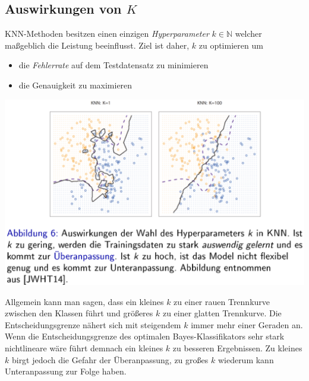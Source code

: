 \documentclass{report}
\begin{document}
  \subsection{Auswirkungen von $K$}	
  KNN-Methoden besitzen einen einzigen \textit{Hyperparameter} $k \in \mathbb{N}$ welcher maßgeblich die Leistung beeinflusst.	
  Ziel ist daher, $k$ zu optimieren um\\	
  \vspace*{-1.5em}	
  \begin{itemize}	
    \item die \textit{Fehlerrate} auf dem Testdatensatz zu minimieren	
    \item die Genauigkeit zu maximieren	
  \end{itemize}	
  
  \begin{center}	
    \includegraphics[scale=.35]{ml05_5}	
  \end{center}	
  
  Allgemein kann man sagen, dass ein kleines $k$ zu einer rauen Trennkurve zwischen den Klassen führt und größeres $k$ zu einer glatten Trennkurve.	
  Die Entscheidungsgrenze nähert sich mit steigendem $k$ immer mehr einer Geraden an.\\	
  Wenn die Entscheidungsgrenze des optimalen Bayes-Klassifikators sehr stark nichtlineare wäre führt demnach ein kleines $k$ zu besseren	
  Ergebnissen. Zu kleines $k$ birgt jedoch die Gefahr der Überanpassung, zu großes $k$ wiederum kann Unteranpassung zur Folge haben.	
  
\end{document}
